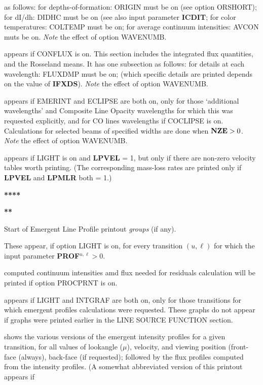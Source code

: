 as follows:
\bull for depths-of-formation: ORIGIN must be on (see option ORSHORT);
\bull for dI/dh: DIDHC must be on (see also input parameter {\bf ICDIT};
\bull for color temperatures: COLTEMP must be on;
\bull for average continuum intensities: AVCON muts be on. \np
{\it Note} the effect of option WAVENUMB.
\blankline
{} \par
appears if CONFLUX is on. This section includes the integrated flux
quantities, and the Rosseland means. It has one subsection as follows:
\bull for details at each wavelength: FLUXDMP must be on; (which specific
details are printed depends on the value of {\bf IFXDS}). \np
{\it Note} the effect of option WAVENUMB.
\blankline
{} \par
appears if EMERINT and ECLIPSE are both on, only for those 
`additional wavelengths' and Composite Line Opacity wavelengths for which
this was requested explicitly, and for CO lines wavelengths if COCLIPSE
is on. Calculations for selected beams of specified widths are done
when ${\bf NZE} > 0$. \np
{\it Note} the effect of option WAVENUMB.
\blankline
{} \par
appears if LIGHT is on and {\bf LPVEL} = 1, but only if there are non-zero
velocity tables worth printing. (The corresponding mass-loss rates are
printed only if {\bf LPVEL} and {\bf LPMLR} both = 1.)
\ej
\centerline{\bf*****} 
\centerline{\bf***}
\centerline{\bf*}
\blankline
\centerline{ Start of Emergent Line Profile printout {\it groups} (if any).}
\blankline
These appear, if option LIGHT is on, for every transition
$(u, \ell)$ for which the input parameter {\bf PROF}$^{u,\ell} > 0$.
\blankline
{} \par
computed continuum intensities amd flux needed for residuals calculation
will be printed if option PROCPRNT is on.
\blankline
{} \par
appears if LIGHT and INTGRAF are both on, only for those
transitions for \break which emergent profiles calculations were requested.
These graphs do not appear if graphs were printed earlier in the
LINE SOURCE FUNCTION section.
\blankline
{} \par
shows the various versions of the emergent intensity profiles for a
given transition, for all values of lookangle ($\mu$), velocity, and
viewing position (front-face (always), back-face (if requested); followed
by the flux profiles computed from the intensity profiles.
(A somewhat abbreviated version of this printout appears if 
